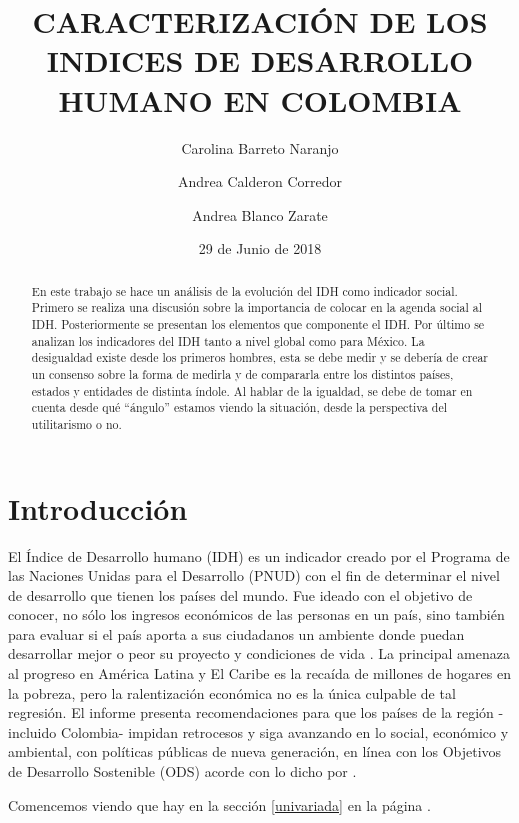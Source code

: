 \documentclass{article}
\title{CARACTERIZACIÓN DE LOS INDICES DE DESARROLLO HUMANO EN COLOMBIA}
\author[1]{\normalsize Carolina Barreto Naranjo}
\author[2]{\normalsize Andrea Calderon Corredor}
\author[3]{\normalsize Andrea Blanco Zarate}
\affil[1,2,3]{\small  Facultad de Ingeniería,Universidad de los Andes\\
\texttt{{c.barreto805,a.calderon,a.blanco}@uniandes.edu.co}}
\affil[1,2,3]{\small Herramientas Computacionales para la Investigación\\}
\date{29 de Junio de 2018}
\begin{document}


\maketitle


\begin{abstract}
En este trabajo se hace un análisis de la evolución del IDH como indicador social. Primero se realiza una discusión sobre la importancia de colocar en la agenda social al IDH. Posteriormente se presentan los elementos que componente el IDH. Por último se analizan los indicadores del IDH tanto a nivel global como para México. La desigualdad existe desde los primeros hombres, esta se debe medir y se debería de crear un consenso sobre la forma de medirla y de compararla entre los distintos países, estados y entidades de distinta índole. Al hablar de la igualdad, se debe de tomar en cuenta desde qué “ángulo” estamos viendo la situación, desde la perspectiva del utilitarismo o no.
\end{abstract}

\section*{Introducción}

El Índice de Desarrollo humano (IDH) es un indicador creado por el Programa de las Naciones Unidas para el Desarrollo (PNUD) con el fin de determinar el nivel de desarrollo que tienen los países del mundo.  Fue ideado con el objetivo de conocer, no sólo los ingresos económicos de las personas en un país, sino también para evaluar si el país aporta a sus ciudadanos un ambiente donde puedan desarrollar mejor o peor su proyecto y condiciones de vida . La principal amenaza al progreso en América Latina y El Caribe es la recaída de millones de hogares en la pobreza, pero la ralentización económica no es la única culpable de tal regresión. El informe presenta recomendaciones para que los países de la región -incluido Colombia- impidan retrocesos y siga avanzando en lo social, económico y ambiental, con políticas públicas de nueva generación, en línea con los Objetivos de Desarrollo Sostenible (ODS) acorde con lo dicho por \cite{misas_a._desarrollo_2001}
.
 
Comencemos viendo que hay en la sección \ref{univariada} en la página \pageref{univariada}.

\clearpage


\clearpage



\clearpage


\clearpage


 

\renewcommand{\refname}{Bibliografia}

\end{document}
